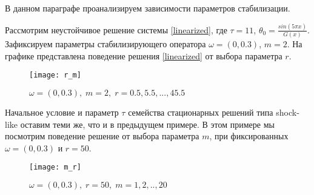 В данном параграфе проанализируем зависимости параметров стабилизации.

\begin{exmp_stbur}
\end{exmp_stbur}

Рассмотрим неустойчивое решение системы \eqref{linearized}, где $\tau = 11$,
$\theta_0 = \frac{sin(5 \pi x)}{G(x)}$. Зафиксируем параметры стабилизирующего
оператора $\omega = (0, 0.3)$, $m = 2$. На графике представлена поведение решения
\eqref{linearized} от выбора параметра $r$.

\begin{figure}[H]
 \centering
  \texttt{[image: r\_m]}
  \caption{$\omega = (0, 0.3), \; m = 2, \; r = 0.5, 5.5, ..., 45.5$}
  \label{fig:test2}
\end{figure}

\begin{exmp_stbur}
\end{exmp_stbur}

Начальное условие и параметр $\tau$ семейства стационарных решений типа
shock-like оставим теми же, что и в предыдущем примере. В этом примере мы
посмотрим поведение решение от выбора параметра $m$, при фиксированных $\omega =
(0, 0.3)$ и $r = 50$.

\begin{figure}[H]
 \centering
  \texttt{[image: m\_r]}
  \caption{$\omega = (0, 0.3), \; r = 50, \; m = 1, 2, .., 20$}
  \label{fig:test2}
\end{figure}
